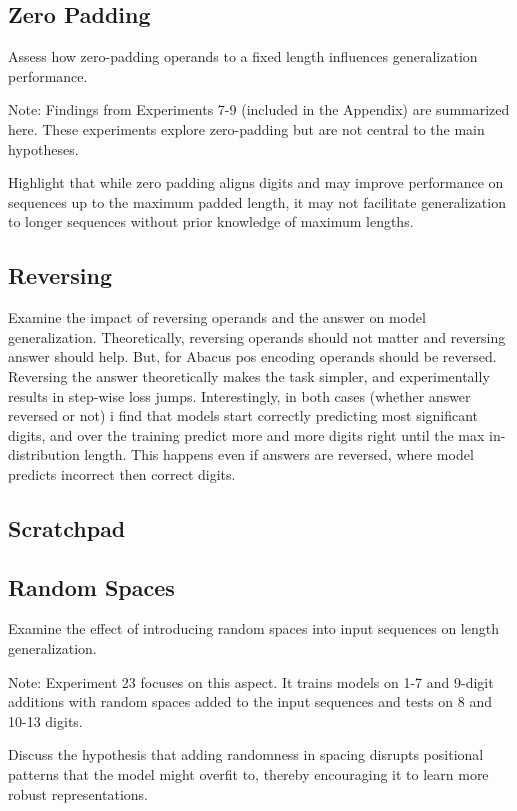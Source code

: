 
\subsection{Zero Padding}
Assess how zero-padding operands to a fixed length influences generalization performance.

Note: Findings from Experiments 7-9 (included in the Appendix) are summarized here. These experiments explore zero-padding but are not central to the main hypotheses.

Highlight that while zero padding aligns digits and may improve performance on sequences up to the maximum padded length, it may not facilitate generalization to longer sequences without prior knowledge of maximum lengths.

\subsection{Reversing}
Examine the impact of reversing operands and the answer on model generalization. Theoretically, reversing operands should not matter and reversing answer should help. But, for Abacus pos encoding operands should be reversed. Reversing the answer theoretically makes the task simpler, and experimentally results in step-wise loss jumps. Interestingly, in both cases (whether answer reversed or not) i find that models start correctly predicting most significant digits, and over the training predict more and more digits right until the max in-distribution length. This happens even if answers are reversed, where model predicts incorrect then correct digits.

\subsection{Scratchpad}

\subsection{Random Spaces}
Examine the effect of introducing random spaces into input sequences on length generalization.

Note: Experiment 23 focuses on this aspect. It trains models on 1-7 and 9-digit additions with random spaces added to the input sequences and tests on 8 and 10-13 digits.

Discuss the hypothesis that adding randomness in spacing disrupts positional patterns that the model might overfit to, thereby encouraging it to learn more robust representations.


